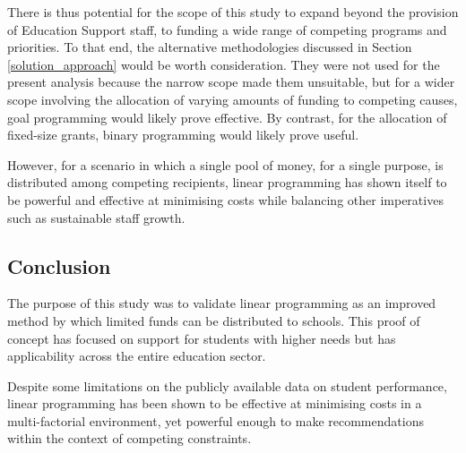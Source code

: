 \documentclass[11pt, a4paper]{article}
\begin{document}
    There is thus potential for the scope of this study to expand beyond the provision of Education Support staff, to funding a wide range of competing programs and priorities. To that end, the alternative methodologies discussed in Section \ref{solution_approach} would be worth consideration. They were not used for the present analysis because the narrow scope made them unsuitable, but for a wider scope involving the allocation of varying amounts of funding to competing causes, goal programming would likely prove effective. By contrast, for the allocation of fixed-size grants, binary programming would likely prove useful.

    However, for a scenario in which a single pool of money, for a single purpose, is distributed among competing recipients, linear programming has shown itself to be powerful and effective at minimising costs while balancing other imperatives such as sustainable staff growth.

    \subsection{Conclusion}

    The purpose of this study was to validate linear programming as an improved method by which limited funds can be distributed to schools. This proof of concept has focused on support for students with higher needs but has applicability across the entire education sector. 

    Despite some limitations on the publicly available data on student performance, linear programming has been shown to be effective at minimising costs in a multi-factorial environment, yet powerful enough to make recommendations within the context of competing constraints. 

    \newpage

    \printbibliography 
\end{document}
